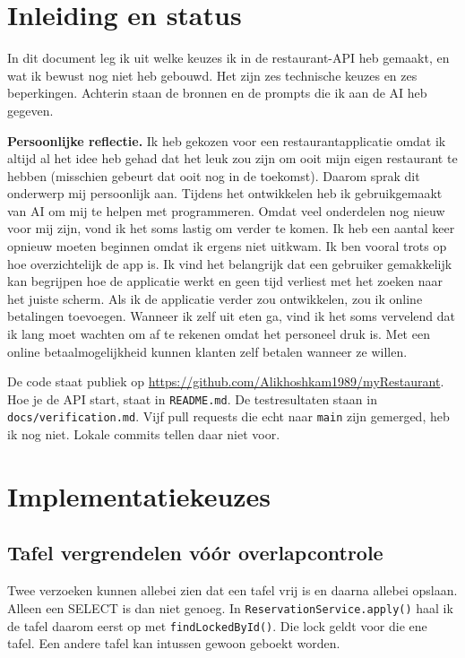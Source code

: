 \documentclass[11pt]{article}
\begin{document}

\section{Inleiding en status}
In dit document leg ik uit welke keuzes ik in de restaurant-API heb gemaakt, en
wat ik bewust nog niet heb gebouwd. Het zijn zes technische keuzes en zes
beperkingen. Achterin staan de bronnen en de prompts die ik aan de AI heb
gegeven.

\textbf{Persoonlijke reflectie.} Ik heb gekozen voor een restaurantapplicatie
omdat ik altijd al het idee heb gehad dat het leuk zou zijn om ooit mijn eigen
restaurant te hebben (misschien gebeurt dat ooit nog in de toekomst). Daarom
sprak dit onderwerp mij persoonlijk aan. Tijdens het ontwikkelen heb ik
gebruikgemaakt van AI om mij te helpen met programmeren. Omdat veel onderdelen
nog nieuw voor mij zijn, vond ik het soms lastig om verder te komen. Ik heb een
aantal keer opnieuw moeten beginnen omdat ik ergens niet uitkwam. Ik ben vooral
trots op hoe overzichtelijk de app is. Ik vind het belangrijk dat een gebruiker
gemakkelijk kan begrijpen hoe de applicatie werkt en geen tijd verliest met het
zoeken naar het juiste scherm. Als ik de applicatie verder zou ontwikkelen, zou
ik online betalingen toevoegen. Wanneer ik zelf uit eten ga, vind ik het soms
vervelend dat ik lang moet wachten om af te rekenen omdat het personeel druk is.
Met een online betaalmogelijkheid kunnen klanten zelf betalen wanneer ze willen.

De code staat publiek op
\url{https://github.com/Alikhoshkam1989/myRestaurant}. Hoe je de API start, staat
in \texttt{README.md}. De testresultaten staan in \texttt{docs/verification.md}.
Vijf pull requests die echt naar \texttt{main} zijn gemerged, heb ik nog niet.
Lokale commits tellen daar niet voor.

\section{Implementatiekeuzes}

\subsection{Tafel vergrendelen vóór overlapcontrole}
Twee verzoeken kunnen allebei zien dat een tafel vrij is en daarna allebei
opslaan. Alleen een SELECT is dan niet genoeg. In
\texttt{ReservationService.apply()} haal ik de tafel daarom eerst op met
\texttt{findLockedById()}. Die lock geldt voor die ene tafel. Een andere tafel
kan intussen gewoon geboekt worden.
\end{document}
